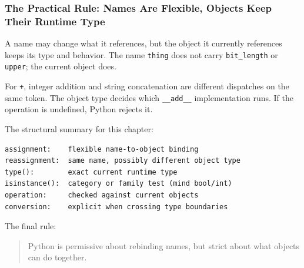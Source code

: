 \subsubsection{The Practical Rule: Names Are Flexible, Objects Keep Their Runtime Type}

A name may change what it references, but the object it currently references keeps its type and behavior. The name \texttt{thing} does not carry \texttt{bit\_length} or \texttt{upper}; the current object does.

For \texttt{+}, integer addition and string concatenation are different dispatches on the same token. The object type decides which \texttt{\_\_add\_\_} implementation runs. If the operation is undefined, Python rejects it.

The structural summary for this chapter:

\begin{verbatim}
assignment:    flexible name-to-object binding
reassignment:  same name, possibly different object type
type():        exact current runtime type
isinstance():  category or family test (mind bool/int)
operation:     checked against current objects
conversion:    explicit when crossing type boundaries
\end{verbatim}

The final rule:

\begin{quote}
Python is permissive about rebinding names, but strict about what objects can do together.
\end{quote}
